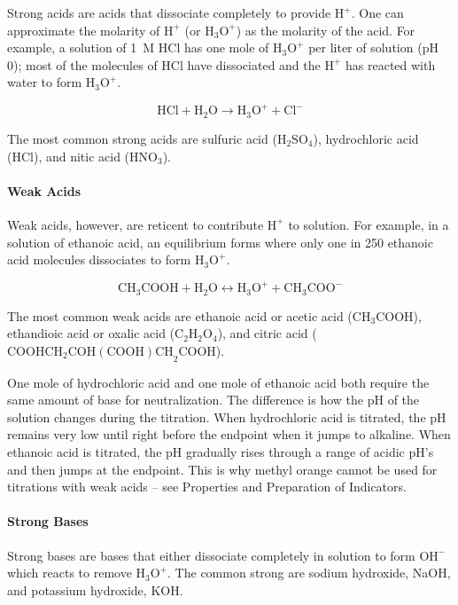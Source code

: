 Strong acids are acids that dissociate completely to provide $\mathrm{H}^{+}$. One can approximate the molarity of $\mathrm{H}^{+}$ (or $\mathrm{H}_3 \mathrm{O}^{+}$) as the molarity of the acid. For example, a solution of 1~M HCl has one mole of $\mathrm{H}_3 \mathrm{O}^{+}$ per liter of solution (pH 0); most of the molecules of HCl have dissociated and the $\mathrm{H}^{+}$ has reacted with water to form $\mathrm{H}_3\mathrm{O}^{+}$.

\[ \mathrm{HCl} + \mathrm{H}_2\mathrm{O} \longrightarrow \mathrm{H}_3 \mathrm{O}^{+} + \mathrm{Cl}^{-} \]

The most common strong acids are sulfuric acid ($\mathrm{H}_2\mathrm{SO}_4$), hydrochloric acid (HCl), and nitic acid ($\mathrm{HNO}_3$).

\paragraph{Weak Acids}

Weak acids, however, are reticent to contribute $\mathrm{H}^{+}$ to solution. For example, in a solution of ethanoic acid, an equilibrium forms where only one in 250 ethanoic acid molecules dissociates to form $\mathrm{H}_3 \mathrm{O}^{+}$.

\[ \mathrm{CH}_3\mathrm{COOH} + \mathrm{H}_2\mathrm{O} \longleftrightarrow \mathrm{H}_3 \mathrm{O}^{+} + \mathrm{CH}_3\mathrm{COO}^{-} \]

The most common weak acids are ethanoic acid or acetic acid ($\mathrm{CH}_3\mathrm{COOH}$), ethandioic acid or oxalic acid ($\mathrm{C}_2\mathrm{H}_2\mathrm{O}_4$), and citric acid ($\mathrm{COOHCH}_2\mathrm{COH(COOH)CH}_2\mathrm{COOH}$).

One mole of hydrochloric acid and one mole of ethanoic acid both require the same amount of base for neutralization. The difference is how the pH of the solution changes during the titration. When hydrochloric acid is titrated, the pH remains very low until right before the endpoint when it jumps to alkaline. When ethanoic acid is titrated, the pH gradually rises through a range of acidic pH's and then jumps at the endpoint. This is why methyl orange cannot be used for titrations with weak acids – see Properties and Preparation of Indicators.

\paragraph{Strong Bases}

Strong bases are bases that either dissociate completely in solution to form $\mathrm{OH}^{-}$ which reacts to remove $\mathrm{H}_3\mathrm{O}^{+}$. The common strong are sodium hydroxide, NaOH, and potassium hydroxide, KOH.

